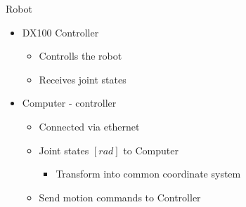 \begin{frame}{Robot}
\begin{itemize}
\item DX100 Controller
\begin{itemize}
\item Controlls the robot
\item Receives joint states
\end{itemize}

\item Computer - controller
\begin{itemize}
\item Connected via ethernet
\item Joint states $[rad]$ to Computer
\begin{itemize}
\item Transform into common coordinate system
\end{itemize}
\item Send motion commands to Controller
\end{itemize}

\end{itemize}
\end{frame}


